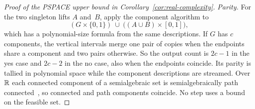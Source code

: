 \begin{proof}[Proof of the PSPACE upper bound in Corollary~\ref{cor:real-complexity}]
\emph{Parity.} For the two singleton lifts $A$ and~$B$, apply the
component algorithm to
\[
  (G\times\{0,1\})\ \cup\ \bigl((A\cup B)\times[0,1]\bigr),
\]
which has a polynomial-size formula from the same descriptions. If $G$ has
$c$ components, the vertical intervals merge one pair of copies when the
endpoints share a component and two pairs otherwise. So the output count
is $2c-1$ in the yes case and $2c-2$ in the no case, also when the endpoints
coincide. Its parity is tallied in polynomial space while the component
descriptions are streamed. Over~$\mathbb{R}$ each connected component of a
semialgebraic set is semialgebraically path
connected~\cite[Theorems~5.22 and~5.23]{basupollackroy2006book}, so
connected and path components coincide. No step uses a bound on the
feasible set.
\end{proof}
